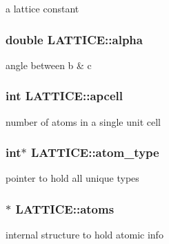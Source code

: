a lattice constant 

\hypertarget{class_l_a_t_t_i_c_e_af8ceb04d3e61325053e42df2c797064d}{}
\subsubsection[{alpha}]{\setlength{\rightskip}{0pt plus 5cm}double L\+A\+T\+T\+I\+C\+E\+::alpha}\label{class_l_a_t_t_i_c_e_af8ceb04d3e61325053e42df2c797064d}


angle between {\ttfamily b \& c} 

\hypertarget{class_l_a_t_t_i_c_e_acf531dce17fd666a58e9007615bc51eb}{}
\subsubsection[{apcell}]{\setlength{\rightskip}{0pt plus 5cm}int L\+A\+T\+T\+I\+C\+E\+::apcell}\label{class_l_a_t_t_i_c_e_acf531dce17fd666a58e9007615bc51eb}


number of atoms in a single unit cell 

\hypertarget{class_l_a_t_t_i_c_e_a8eb1ea5b25b8678b136c5e663d4aeb0e}{}
\subsubsection[{atom\+\_\+type}]{\setlength{\rightskip}{0pt plus 5cm}int$\ast$ L\+A\+T\+T\+I\+C\+E\+::atom\+\_\+type}\label{class_l_a_t_t_i_c_e_a8eb1ea5b25b8678b136c5e663d4aeb0e}


pointer to hold all unique types 

\hypertarget{class_l_a_t_t_i_c_e_aeb9f05d5a05013f9e39771004ee7a351}{}
\subsubsection[{atoms}]{$\ast$ L\+A\+T\+T\+I\+C\+E\+::atoms}\label{class_l_a_t_t_i_c_e_aeb9f05d5a05013f9e39771004ee7a351}


internal structure to hold atomic info 

